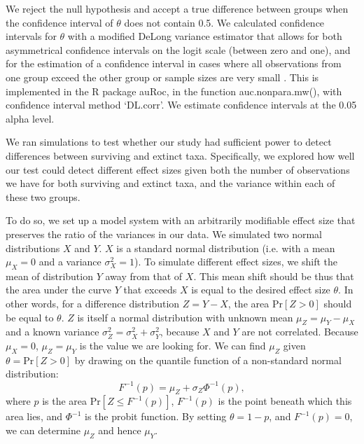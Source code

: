 \documentclass[a4paper]{article}
\begin{document}
We reject the null hypothesis and accept a true difference between groups when the confidence interval of $\theta$ does not contain 0.5. We calculated confidence intervals for $\theta$ with a modified DeLong variance estimator that allows for both asymmetrical confidence intervals on the logit scale (between zero and one), and for the estimation of a confidence interval in cases where all observations from one group exceed the other group or sample sizes are very small \parencite{permeConfidenceIntervalsMann2019}. This is implemented in the R package auRoc, in the function auc.nonpara.mw(), with confidence interval method `DL.corr'. 
We estimate confidence intervals at the 0.05 alpha level.

We ran simulations to test whether our study had sufficient power to detect differences between surviving and extinct taxa. 
Specifically, we explored how well our test could detect different effect sizes given both the number of observations we have for both surviving and extinct taxa, and the variance within each of these two groups.

To do so, we set up a model system with an arbitrarily modifiable effect size that preserves the ratio of the variances in our data.
We simulated two normal distributions $X$ and $Y$. $X$ is a standard normal distribution (i.e. with a mean $\mu_{X} = 0$ and a variance $\sigma^{2}_{X} = 1$). To simulate different effect sizes, we shift the mean of distribution $Y$ away from that of $X$. This mean shift should be thus that the area under the curve $Y$ that exceeds $X$ is equal to the desired effect size $\theta$. In other words, for a difference distribution $Z = Y - X$, the area $\mathrm{Pr}[Z > 0]$ should be equal to $\theta$. $Z$ is itself a normal distribution with unknown mean $\mu_{Z} = \mu_{Y} - \mu_{X}$ and a known variance $\sigma^{2}_{Z} = \sigma^{2}_{X} + \sigma^{2}_{Y}$, because $X$ and $Y$ are not correlated. Because $\mu_{X} = 0$, $\mu_{Z} = \mu_{Y}$ is the value we are looking for. We can find $\mu_{Z}$ given $\theta = \mathrm{Pr}[Z > 0]$ by drawing on the quantile function of a non-standard normal distribution:
\begin{equation}
F^{-1}(p) = \mu_{Z} + \sigma_{Z} \Phi^{-1}(p), 
\end{equation}
where $p$ is the area $\mathrm{Pr}[Z \leq F^{-1}(p)]$, $F^{-1}(p)$ is the point beneath which this area lies, and $\Phi^{-1}$ is the probit function. By setting $\theta = 1 - p$, and $F^{-1}(p) = 0$, we can determine $\mu_{Z}$ and hence $\mu_{Y}$.
\end{document}
